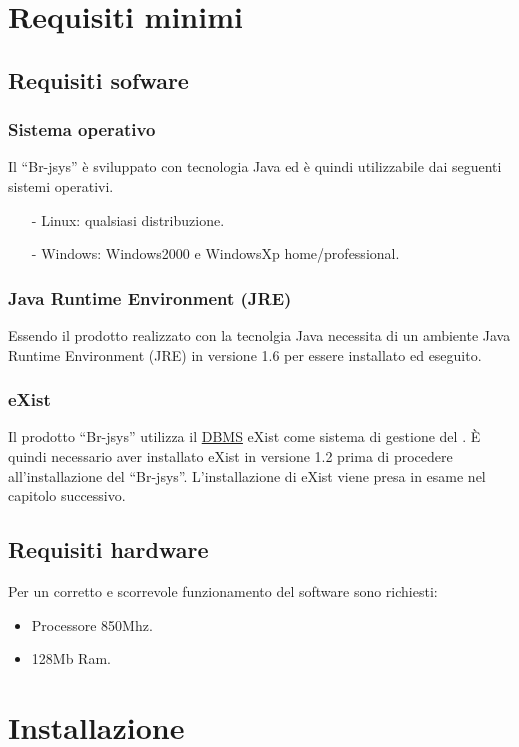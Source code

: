 \chapter{Requisiti minimi}
\section{Requisiti sofware }
\subsection{Sistema operativo}
Il ``Br-jsys'' \`e sviluppato con tecnologia Java ed \`e quindi utilizzabile dai seguenti sistemi operativi.
\begin{itemize}
\item[-] Linux: qualsiasi distribuzione.
\item[-] Windows: Windows2000 e WindowsXp home/professional.
\end{itemize}
\subsection{Java Runtime Environment (JRE)}
Essendo il prodotto realizzato con la tecnolgia Java necessita di un ambiente Java Runtime Environment (JRE) in versione 1.6 per essere installato ed eseguito.
\subsection{eXist}
Il prodotto ``Br-jsys'' utilizza il \underline{DBMS} eXist come sistema di gestione del \rp. \`E quindi necessario aver installato eXist in versione 1.2 prima di procedere all'installazione del ``Br-jsys''. L'installazione di eXist viene presa in esame nel capitolo successivo.
\section{Requisiti hardware}
Per un corretto e scorrevole funzionamento del software sono richiesti:
\begin{itemize}
\item Processore 850Mhz.
\item 128Mb Ram.
\end{itemize}

\chapter{Installazione}
